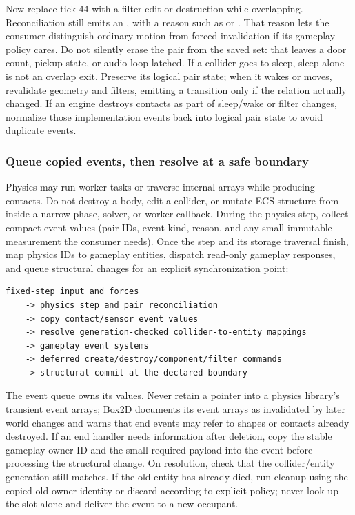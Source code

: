 Now replace tick 44 with a filter edit or destruction while overlapping. Reconciliation still emits an , with a reason such as  or . That reason lets the consumer distinguish ordinary motion from forced invalidation if its gameplay policy cares. Do not silently erase the pair from the saved set: that leaves a door count, pickup state, or audio loop latched. If a collider goes to sleep, sleep alone is not an overlap exit. Preserve its logical pair state; when it wakes or moves, revalidate geometry and filters, emitting a transition only if the relation actually changed. If an engine destroys contacts as part of sleep/wake or filter changes, normalize those implementation events back into logical pair state to avoid duplicate  events.

\subsubsection{Queue copied events, then resolve at a safe boundary}\label{05-engine-i-ch017-queue-copied-events-then-resolve-at-a-safe-boundary}

\hypertarget{05-engine-i-ch017-queue-copied-events-then-resolve-at-a-safe-boundary}{}

Physics may run worker tasks or traverse internal arrays while producing contacts. Do not destroy a body, edit a collider, or mutate ECS structure from inside a narrow-phase, solver, or worker callback. During the physics step, collect compact event values (pair IDs, event kind, reason, and any small immutable measurement the consumer needs). Once the step and its storage traversal finish, map physics IDs to gameplay entities, dispatch read-only gameplay responses, and queue structural changes for an explicit synchronization point:

\begin{verbatim}
fixed-step input and forces
    -> physics step and pair reconciliation
    -> copy contact/sensor event values
    -> resolve generation-checked collider-to-entity mappings
    -> gameplay event systems
    -> deferred create/destroy/component/filter commands
    -> structural commit at the declared boundary
\end{verbatim}

The event queue owns its values. Never retain a pointer into a physics library's transient event arrays; Box2D documents its event arrays as invalidated by later world changes and warns that end events may refer to shapes or contacts already destroyed. If an end handler needs information after deletion, copy the stable gameplay owner ID and the small required payload into the event before processing the structural change. On resolution, check that the collider/entity generation still matches. If the old entity has already died, run cleanup using the copied old owner identity or discard according to explicit policy; never look up the slot alone and deliver the event to a new occupant.

